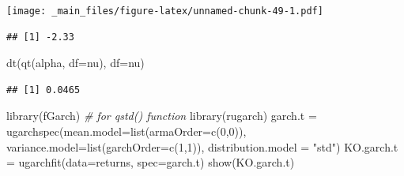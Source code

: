 \documentclass[
  oneside]{book}
\newenvironment{Shaded}{\begin{snugshade}}{\end{snugshade}}
\newcommand{\AttributeTok}[1]{\textcolor[rgb]{0.77,0.63,0.00}{#1}}
\newcommand{\CommentTok}[1]{\textcolor[rgb]{0.56,0.35,0.01}{\textit{#1}}}
\newcommand{\DecValTok}[1]{\textcolor[rgb]{0.00,0.00,0.81}{#1}}
\newcommand{\FloatTok}[1]{\textcolor[rgb]{0.00,0.00,0.81}{#1}}
\newcommand{\FunctionTok}[1]{\textcolor[rgb]{0.00,0.00,0.00}{#1}}
\newcommand{\NormalTok}[1]{#1}
\newcommand{\OtherTok}[1]{\textcolor[rgb]{0.56,0.35,0.01}{#1}}
\newcommand{\SpecialCharTok}[1]{\textcolor[rgb]{0.00,0.00,0.00}{#1}}
\newcommand{\StringTok}[1]{\textcolor[rgb]{0.31,0.60,0.02}{#1}}
\begin{document}
\texttt{[image: \_main\_files/figure-latex/unnamed-chunk-49-1.pdf]}

\begin{Shaded}
\end{Shaded}

\begin{verbatim}
## [1] -2.33
\end{verbatim}

\begin{Shaded}
\begin{Highlighting}[]
\FunctionTok{dt}\NormalTok{(}\FunctionTok{qt}\NormalTok{(alpha, }\AttributeTok{df=}\NormalTok{nu), }\AttributeTok{df=}\NormalTok{nu)}
\end{Highlighting}
\end{Shaded}

\begin{verbatim}
## [1] 0.0465
\end{verbatim}

\begin{Shaded}
\begin{Highlighting}[]
\FunctionTok{library}\NormalTok{(fGarch) }\CommentTok{\# for qstd() function}
\FunctionTok{library}\NormalTok{(rugarch)}
\NormalTok{garch.t }\OtherTok{=} \FunctionTok{ugarchspec}\NormalTok{(}\AttributeTok{mean.model=}\FunctionTok{list}\NormalTok{(}\AttributeTok{armaOrder=}\FunctionTok{c}\NormalTok{(}\DecValTok{0}\NormalTok{,}\DecValTok{0}\NormalTok{)),}
\AttributeTok{variance.model=}\FunctionTok{list}\NormalTok{(}\AttributeTok{garchOrder=}\FunctionTok{c}\NormalTok{(}\DecValTok{1}\NormalTok{,}\DecValTok{1}\NormalTok{)),}
\AttributeTok{distribution.model =} \StringTok{"std"}\NormalTok{)}
\NormalTok{KO.garch.t }\OtherTok{=} \FunctionTok{ugarchfit}\NormalTok{(}\AttributeTok{data=}\NormalTok{returns, }\AttributeTok{spec=}\NormalTok{garch.t)}
\FunctionTok{show}\NormalTok{(KO.garch.t)}
\end{Highlighting}
\end{Shaded}
\end{document}
